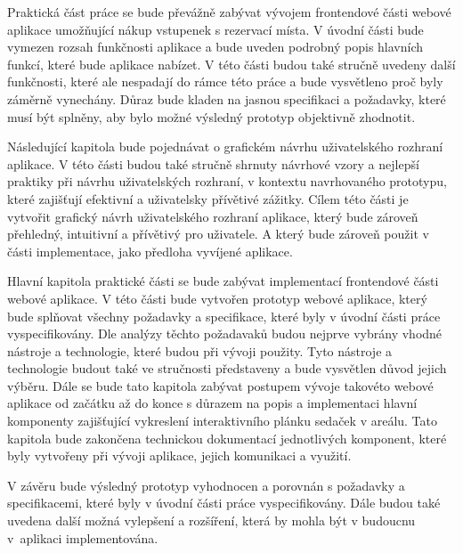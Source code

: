 Praktická část práce se bude převážně zabývat vývojem frontendové části webové aplikace umožňující nákup vstupenek s rezervací místa. V úvodní části bude vymezen rozsah funkčnosti aplikace a bude uveden podrobný popis hlavních funkcí, které bude aplikace nabízet. V této části budou také stručně uvedeny další funkčnosti, které ale nespadají do rámce této práce a bude vysvětleno proč byly záměrně vynechány. Důraz bude kladen na jasnou specifikaci a požadavky, které musí být splněny, aby bylo možné výsledný prototyp objektivně zhodnotit.

Následující kapitola bude pojednávat o grafickém návrhu uživatelského rozhraní aplikace. V této části budou také stručně shrnuty návrhové vzory a nejlepší praktiky při návrhu uživatelských rozhraní, v kontextu navrhovaného prototypu, které zajišťují efektivní a uživatelsky přívětivé zážitky. Cílem této části je vytvořit grafický návrh uživatelského rozhraní aplikace, který bude zároveň přehledný, intuitivní a přívětivý pro uživatele. A který bude zároveň použit v části implementace, jako předloha vyvíjené aplikace.

Hlavní kapitola praktické části se bude zabývat implementací frontendové části webové aplikace. V této části bude vytvořen prototyp webové aplikace, který bude splňovat všechny požadavky a specifikace, které byly v úvodní části práce vyspecifikovány. Dle analýzy těchto požadavaků budou nejprve vybrány vhodné nástroje a technologie, které budou při vývoji použity. Tyto nástroje a technologie budout také ve stručnosti představeny a bude vysvětlen důvod jejich výběru. Dále se bude tato kapitola zabývat postupem vývoje takovéto webové aplikace od začátku až do konce s důrazem na popis a implementaci hlavní komponenty zajišťující vykreslení interaktivního plánku sedaček v areálu. Tato kapitola bude zakončena technickou dokumentací jednotlivých komponent, které byly vytvořeny při vývoji aplikace, jejich komunikaci a využití.

V závěru bude výsledný prototyp vyhodnocen a porovnán s požadavky a specifikacemi, které byly v úvodní části práce vyspecifikovány. Dále budou také uvedena další možná vylepšení a rozšíření, která by mohla být v budoucnu v~aplikaci implementována.
